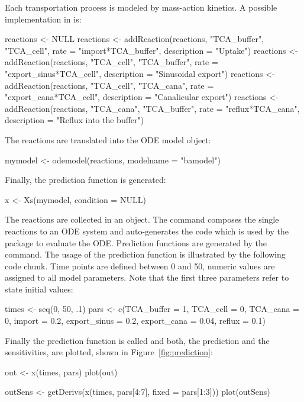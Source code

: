 \documentclass[article]{jss}
\begin{document}
Each transportation process is modeled by mass-action kinetics. A possible implementation in  is:
\begin{CodeChunk}
	\begin{CodeInput}
  reactions <- NULL
  reactions <- addReaction(reactions, "TCA_buffer", "TCA_cell",
  			 rate = "import*TCA_buffer",
  			 description = "Uptake")
  reactions <- addReaction(reactions, "TCA_cell", "TCA_buffer",
  			 rate = "export_sinus*TCA_cell",
  			 description = "Sinusoidal export")
  reactions <- addReaction(reactions, "TCA_cell", "TCA_cana",
  			 rate = "export_cana*TCA_cell",
  			 description = "Canalicular export")
  reactions <- addReaction(reactions, "TCA_cana", "TCA_buffer",
  			 rate = "reflux*TCA_cana",
  			 description = "Reflux into the buffer")
	\end{CodeInput}
\end{CodeChunk}
The reactions are translated into the ODE model object:
\begin{CodeChunk}
	\begin{CodeInput}
  mymodel <- odemodel(reactions, modelname = "bamodel")
	\end{CodeInput}
\end{CodeChunk}
Finally, the prediction function is generated:
\begin{CodeChunk}
	\begin{CodeInput}
  x <- Xs(mymodel, condition = NULL)
	\end{CodeInput}
\end{CodeChunk}
The reactions are collected in an  object. The  command composes the single reactions to an ODE system and auto-generates the  code which is used by the  package to evaluate the ODE. Prediction functions are generated by the  command. The usage of the prediction function is illustrated by the following code chunk. Time points are defined between 0 and 50, numeric values are assigned to all model parameters. Note that the first three parameters refer to state initial values: 
\begin{CodeChunk}
\begin{CodeInput}
  times <- seq(0, 50, .1)
  pars <- c(TCA_buffer = 1,          
            TCA_cell = 0,            
	    TCA_cana = 0,            
	    import = 0.2,
	    export_sinus = 0.2,
	    export_cana = 0.04,
	    reflux = 0.1)
\end{CodeInput}
\end{CodeChunk}
Finally the prediction function is called and both, the prediction and the sensitivities, are plotted, shown in Figure~\ref{fig:prediction}:
\begin{CodeChunk}
\begin{CodeInput}
  out <- x(times, pars)
  plot(out)
  
  outSens <- getDerivs(x(times, pars[4:7], fixed = pars[1:3]))
  plot(outSens)
\end{CodeInput}
\end{CodeChunk}
\end{document}

